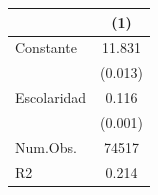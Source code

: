 \begin{table}
\centering
\begin{tabular}[t]{lc}
\toprule
  & (1)\\
\midrule
Constante & 11.831\\
 & (0.013)\\
Escolaridad & 0.116\\
 & (0.001)\\
\midrule
Num.Obs. & 74517\\
R2 & 0.214\\
\bottomrule
\end{tabular}
\end{table}
